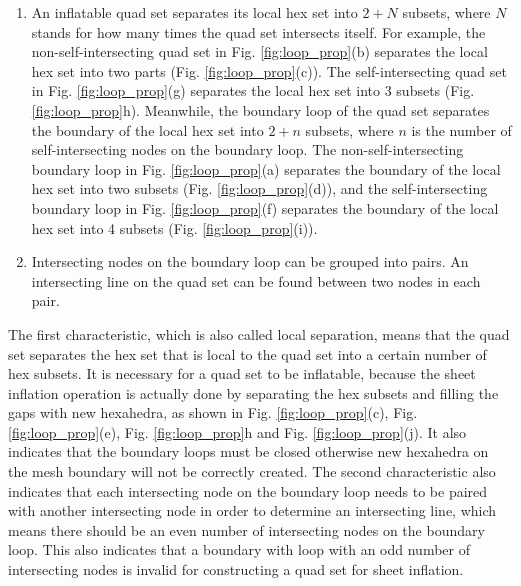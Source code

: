 \documentclass[final,5p,times,twocolumn]{elsarticle}
\begin{document}
\begin{enumerate}
\item An inflatable quad set separates its local hex set into $2+N$ subsets, where $N$ stands for how many times the quad set intersects itself. For example, the non-self-intersecting quad set in Fig. \ref{fig:loop_prop}(b) separates the local hex set into two parts (Fig. \ref{fig:loop_prop}(c)). The self-intersecting quad set in Fig. \ref{fig:loop_prop}(g) separates the local hex set into 3 subsets (Fig. \ref{fig:loop_prop}h). Meanwhile, the boundary loop of the quad set separates the boundary of the local hex set into $2+n$ subsets, where $n$ is the number of self-intersecting nodes on the boundary loop. The non-self-intersecting boundary loop in Fig. \ref{fig:loop_prop}(a) separates the boundary of the local hex set into two subsets (Fig. \ref{fig:loop_prop}(d)), and the self-intersecting boundary loop in Fig. \ref{fig:loop_prop}(f) separates the boundary of the local hex set into 4 subsets (Fig. \ref{fig:loop_prop}(i)).

\item Intersecting nodes on the boundary loop can be grouped into pairs. An intersecting line on the quad set can be found between two nodes in each pair.
\end{enumerate}

The first characteristic, which is also called local separation, means that the quad set separates the hex set that is local to the quad set into a certain number of hex subsets. It is necessary for a quad set to be inflatable, because the sheet inflation operation is actually done by separating the hex subsets and filling the gaps with new hexahedra, as shown in Fig. \ref{fig:loop_prop}(c), Fig. \ref{fig:loop_prop}(e), Fig. \ref{fig:loop_prop}h and Fig. \ref{fig:loop_prop}(j). It also indicates that the boundary loops must be closed otherwise new hexahedra on the mesh boundary will not be correctly created. The second characteristic also indicates that each intersecting node on the boundary loop needs to be paired with another intersecting node in order to determine an intersecting line, which means there should be an even number of intersecting nodes on the boundary loop. This also indicates that a boundary with loop with an odd number of intersecting nodes is invalid for constructing a quad set for sheet inflation.
\end{document}
